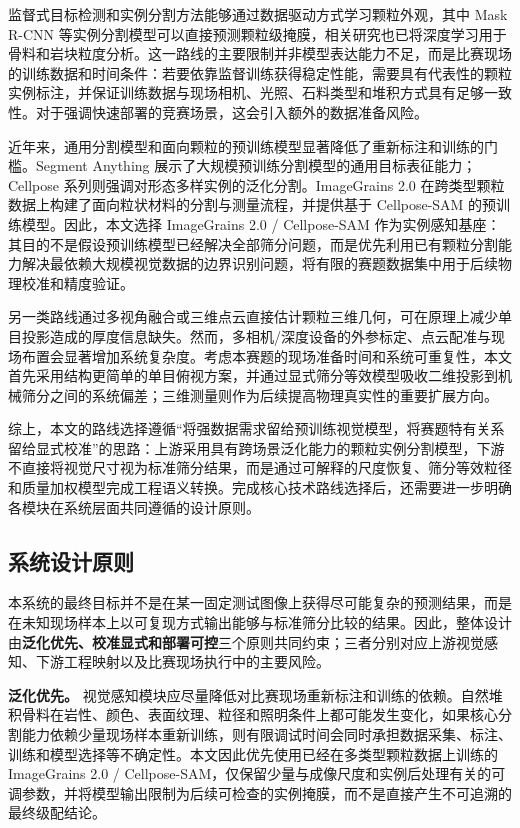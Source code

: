 监督式目标检测和实例分割方法能够通过数据驱动方式学习颗粒外观，其中 Mask R-CNN 等实例分割模型可以直接预测颗粒级掩膜\cite{he2017maskRCNN}，相关研究也已将深度学习用于骨料和岩块粒度分析\cite{zhang2020aggregate,ferello2023rock,zeng2022automation}。这一路线的主要限制并非模型表达能力不足，而是比赛现场的训练数据和时间条件：若要依靠监督训练获得稳定性能，需要具有代表性的颗粒实例标注，并保证训练数据与现场相机、光照、石料类型和堆积方式具有足够一致性。对于强调快速部署的竞赛场景，这会引入额外的数据准备风险。

近年来，通用分割模型和面向颗粒的预训练模型显著降低了重新标注和训练的门槛。Segment Anything 展示了大规模预训练分割模型的通用目标表征能力\cite{kirillov2023segmentAnything}；Cellpose 系列则强调对形态多样实例的泛化分割\cite{stringer2021cellpose,pachitariu2025cellposeSAM}。ImageGrains 2.0 在跨类型颗粒数据上构建了面向粒状材料的分割与测量流程，并提供基于 Cellpose-SAM 的预训练模型\cite{mair2026imagegrains2,zenodoIG2}。因此，本文选择 ImageGrains 2.0 / Cellpose-SAM 作为实例感知基座：其目的不是假设预训练模型已经解决全部筛分问题，而是优先利用已有颗粒分割能力解决最依赖大规模视觉数据的边界识别问题，将有限的赛题数据集中用于后续物理校准和精度验证。

另一类路线通过多视角融合或三维点云直接估计颗粒三维几何，可在原理上减少单目投影造成的厚度信息缺失\cite{fan2021multiview,yang2023pointCloud}。然而，多相机/深度设备的外参标定、点云配准与现场布置会显著增加系统复杂度。考虑本赛题的现场准备时间和系统可重复性，本文首先采用结构更简单的单目俯视方案，并通过显式筛分等效模型吸收二维投影到机械筛分之间的系统偏差；三维测量则作为后续提高物理真实性的重要扩展方向。

综上，本文的路线选择遵循“将强数据需求留给预训练视觉模型，将赛题特有关系留给显式校准”的思路：上游采用具有跨场景泛化能力的颗粒实例分割模型，下游不直接将视觉尺寸视为标准筛分结果，而是通过可解释的尺度恢复、筛分等效粒径和质量加权模型完成工程语义转换。完成核心技术路线选择后，还需要进一步明确各模块在系统层面共同遵循的设计原则。

\subsection{系统设计原则}
\label{sec:design-principles}

本系统的最终目标并不是在某一固定测试图像上获得尽可能复杂的预测结果，而是在未知现场样本上以可复现方式输出能够与标准筛分比较的结果。因此，整体设计由\textbf{泛化优先、校准显式和部署可控}三个原则共同约束；三者分别对应上游视觉感知、下游工程映射以及比赛现场执行中的主要风险。

\textbf{泛化优先。} 视觉感知模块应尽量降低对比赛现场重新标注和训练的依赖。自然堆积骨料在岩性、颜色、表面纹理、粒径和照明条件上都可能发生变化，如果核心分割能力依赖少量现场样本重新训练，则有限调试时间会同时承担数据采集、标注、训练和模型选择等不确定性。本文因此优先使用已经在多类型颗粒数据上训练的 ImageGrains 2.0 / Cellpose-SAM，仅保留少量与成像尺度和实例后处理有关的可调参数，并将模型输出限制为后续可检查的实例掩膜，而不是直接产生不可追溯的最终级配结论。

